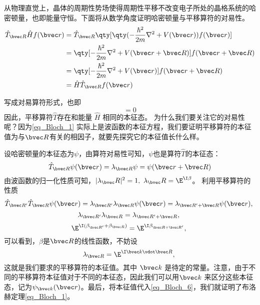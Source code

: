 从物理直觉上，晶体的周期性势场使得周期性平移不改变电子所处的晶格系统的哈密顿量，也即能量守恒。下面将从数学角度证明哈密顿量与平移算符的对易性。
\begin{equation}
\begin{aligned}
\hat{T}_{\bvec R} \hat{H} f(\bvec r) &= \hat{T}_{\bvec R} \qty[\qty(-\frac{\hbar^2}{2m}\nabla^2+V(\bvec r) ) f(\bvec r)] \\
&= \qty[-\frac{\hbar^2}{2m}\nabla^2+V(\bvec r + \bvec R)]  f(\bvec r + \bvec R)\\
&= \qty[-\frac{\hbar^2}{2m}\nabla^2+V(\bvec r) ] f(\bvec r+ \bvec R)\\
& = \hat{H} \hat{T}_{\bvec R} f(\bvec r)
\end{aligned}
\end{equation}

写成对易算符形式，也即
\begin{equation}
[\hat{T},\hat{H}] = 0
\end{equation}
因此，平移算符$\hat{T}$存在和能量 $\hat{H}$ 相同的本征态。
为什么我们要关注它的对易性呢？因为\autoref{eq_Bloch_1} 实际上是波函数的本征方程，我们要证明平移算符的本征值为与$\bvec R$有关的相因子，就要先探究它的本征值长什么样。

设哈密顿量的本征态为$\psi$，由算符对易性可知，$\psi$也是算符$\hat{T}$的本征态：
\begin{equation}\label{eq_Bloch_6}
\hat{T}_{\bvec R} \psi (\bvec r) = \lambda_{\bvec R}\psi =\psi(\bvec r + \bvec R) 
\end{equation}
由波函数的归一化性质可知，$|\lambda_\bvec R |^2 = 1,~ \lambda_\bvec R = \E^{\I \beta}$。 利用平移算符的性质
\begin{equation}
\hat{T}_{\bvec R'} \hat{T}_{\bvec R}\psi (\bvec r) = \lambda_{\bvec R'}\lambda_{\bvec R}\psi (\bvec r) = \lambda_{\bvec R' + \bvec R} \psi (\bvec r),~
\end{equation}
\begin{equation}
\lambda_{\bvec R'}\lambda_{\bvec R} =  \lambda_{\bvec R' + \bvec R},~
\end{equation}
\begin{equation}
\E^{\I (\beta_{\bvec R'}+ \beta_{\bvec R})} = \E^{\I \beta_{\bvec R + \bvec R'}},~
\end{equation}
可以看到，$\beta$是$\bvec R$的线性函数，不妨设
\begin{equation}
\lambda_{\bvec R} = \E^{\I \bvec k \vdot  \bvec R},~
\end{equation}
这就是我们要求的平移算符的本征值。其中 $\bvec k$ 是待定的常量。注意，由于不同的平移算符本征值对于不同的本征态，因此我们可以用$\bvec k$ 来区分这些本征态，记为$\psi_{\bvec k} (\bvec r)$。最后，将本征值代入\autoref{eq_Bloch_6}，我们就证明了布洛赫定理\autoref{eq_Bloch_1}。

